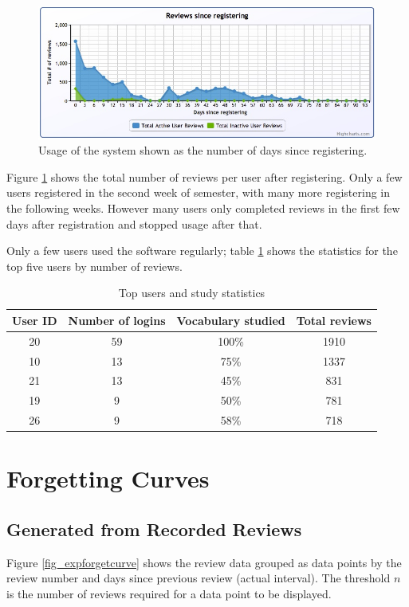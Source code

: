 \begin{figure}[h!]
\includegraphics[width=12cm]{img/usage_sinceregistering.jpg}
\caption{Usage of the system shown as the number of days since registering.}
\label{fig_usage_sinceregistering}
\end{figure}

Figure \ref{fig_usage_sinceregistering} shows the total number of reviews per user
after registering. Only a few users registered in the second week of semester,
 with many more registering in the following weeks. However many users only
 completed reviews in the first few days after registration and stopped usage after
 that.
 
Only a few users used the software regularly; table \ref{tbl_topusers} shows the
statistics for the top five users by number of reviews.

\begin{table}[h!]
\caption{Top users and study statistics}
\label{tbl_topusers}
\begin{tabular}{|c|c|c|c|}
\hline
User ID & Number of logins & Vocabulary studied & Total reviews \\
\hline
20 & 59 & 100\% & 1910 \\
10 & 13 & 75\% & 1337 \\
21 & 13 & 45\% & 831 \\
19 & 9 & 50\% & 781 \\
26 & 9 & 58\% & 718 \\
\hline
\end{tabular}
\end{table}

\section{Forgetting Curves}
\subsection*{Generated from Recorded Reviews}

Figure \ref{fig_expforgetcurve} shows the review data grouped
as data points by the review number and days since previous review (actual interval).
The threshold $n$
is the number of reviews required for a data point to be displayed.

